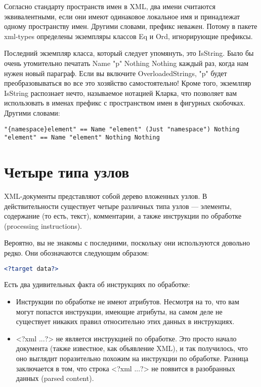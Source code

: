 Согласно стандарту пространств имен в XML, два имени считаются эквивалентными, если они имеют одинаковое локальное имя и принадлежат одному пространству имен. Другими словами, префикс неважен. Потому в пакете xml-types определены экземпляры классов Eq и Ord, игнорирующие префиксы.

Последний экземпляр класса, который следует упомянуть, это IsString. Было бы очень утомительно печатать Name "p" Nothing Nothing каждый раз, когда нам нужен новый параграф. Если вы включите OverloadedStrings, "p" будет преобразовываться во все это хозяйство самостоятельно! Кроме того, экземлпяр IsString распознает нечто, называемое нотацией Кларка, что позволяет вам использовать в именах префикс с пространством имен в фигурных скобочках. Другими словами:

\begin{lstlisting}
"{namespace}element" == Name "element" (Just "namespace") Nothing
"element" == Name "element" Nothing Nothing
\end{lstlisting}

\section{Четыре типа узлов} %

XML-документы представляют собой дерево вложенных узлов. В действительности существует четыре различных типа узлов --- элементы, содержание (то есть, текст), комментарии, а также инструкции по обработке (processing instructions).

\begin{remark}
Вероятно, вы не знакомы с последними, поскольку они используются довольно редко. Они обозначаются следующим образом:

\begin{lstlisting}[language=XML]
<?target data?>
\end{lstlisting}

Есть два удивительных факта об инструкциях по обработке:

\begin{itemize}
\item Инструкции по обработке не имеют атрибутов. Несмотря на то, что вам могут попастся инструкции, имеющие атрибуты, на самом деле не существует никаких правил относительно этих данных в инструкциях. %
\item <?xml ...?> не является инструкцией по обработке. Это просто начало документа (также известное, как объявление XML), и так получилось, что оно выглядит поразительно похожим на инструкции по обработке. Разница заключается в том, что строка <?xml ...?> не появится в разобранных данных (parsed content).
\end{itemize}

\end{remark}

